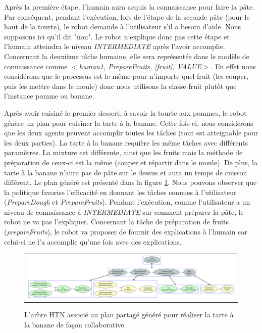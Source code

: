 \documentclass[a4paper,11pt,twoside]{StyleThese}
\begin{document}
Après la première étape, l'humain aura acquis la connaissance pour faire la pâte. Par conséquent, pendant l'exécution, lors de l'étape de la seconde pâte (pour le haut de la tourte), le robot demande à l'utilisateur s'il a besoin d'aide. Nous supposons ici qu'il dit "non". Le robot n'explique donc pas cette étape et l'humain atteindra le niveau \textit{INTERMEDIATE} après l'avoir accomplie. Concernant la deuxième tâche humaine, elle sera représentée dans le modèle de connaissance comme \textit{$<$human1, PrepareFruits, [fruit], VALUE$>$}. En effet nous considérons que le processus est le même pour n'importe quel fruit (les couper, puis les mettre dans le moule) donc nous utilisons la classe fruit plutôt que l'instance pomme ou banane.
%
%

Après avoir cuisiné le premier dessert, à savoir la tourte aux pommes, le robot génère un plan pour cuisiner la tarte à la banane. Cette fois-ci, nous considérons que les deux agents peuvent accomplir toutes les tâches (tout est atteignable pour les deux parties). La tarte à la banane requière les même tâches avec différents paramètres. La mixture est différente, ainsi que les fruits mais la méthode de préparation de ceux-ci est la même (couper et répartir dans le moule). De plus, la tarte à la banane n'aura pas de pâte sur le dessus et aura un temps de cuisson différent. Le plan généré est présenté dans la figure \ref{fig:bananaPlan}. Nous pouvons observer que la politique favorise l'efficacité en donnant les tâches connues à l'utilisateur (\textit{PrepareDough} et \textit{PrepareFruits}). Pendant l'exécution, comme l'utilisateur a un niveau de connaissance à \textit{INTERMEDIATE} sur comment préparer la pâte, le robot ne va pas l'expliquer. Concernant la tâche de préparation de fruits (\textit{prepareFruits}), le robot va proposer de fournir des explications à l'humain car celui-ci ne l'a accomplie qu'une fois avec des explications.


\clearpage

\begin{figure}
 \centering
 \begin{tabular}{c}
  \includegraphics[width=1.0\textwidth]{img/bananaPie.pdf}
 \end{tabular}
 \caption{L'arbre HTN associé au plan partagé généré pour réaliser la tarte à la banane de façon collaborative.}
 \label{fig:bananaPlan}
\end{figure}
\end{document}
